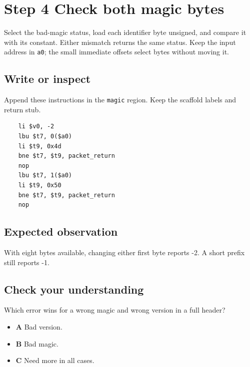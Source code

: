 \section{Step 4 Check both magic bytes}\label{packet-s04}

Select the bad-magic status, load each identifier byte unsigned, and compare it with its constant. Either mismatch returns the same status. Keep the input address in \texttt{a0}; the small immediate offsets select bytes without moving it.

\subsection{Write or inspect}
Append these instructions in the \texttt{magic} region. Keep the scaffold labels and return stub.

\begin{verbatim}
    li $v0, -2
    lbu $t7, 0($a0)
    li $t9, 0x4d
    bne $t7, $t9, packet_return
    nop
    lbu $t7, 1($a0)
    li $t9, 0x50
    bne $t7, $t9, packet_return
    nop
\end{verbatim}

\subsection{Expected observation}
With eight bytes available, changing either first byte reports -2. A short prefix still reports -1.

\subsection{Check your understanding}
Which error wins for a wrong magic and wrong version in a full header?

\begin{itemize}
  \item \textbf{A} Bad version.
  \item \textbf{B} Bad magic.
  \item \textbf{C} Need more in all cases.
\end{itemize}
